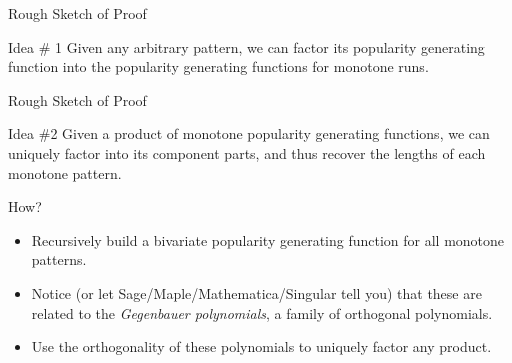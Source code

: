 \documentclass[xcolor=table,dvipsnames]{beamer}
\begin{document}
\begin{frame}{Rough Sketch of Proof}
  \pause
  \begin{block}{Idea \# 1}
    Given any arbitrary pattern, we can factor its popularity generating
    function into the popularity generating functions for monotone runs. 
  \end{block}

  \pause
  \begin{center}
  \end{center}
\end{frame}



\begin{frame}{Rough Sketch of Proof}
  \pause
  \begin{block}{Idea \#2}
    Given a product of monotone popularity generating functions, we can uniquely
    factor into its component parts, and thus recover the lengths of each
    monotone pattern.
  \end{block}
  \pause
  \begin{block}{How?}
    \begin{itemize}
      \pause
      \item Recursively build a bivariate popularity generating function for all
      monotone patterns. 
      \pause
      \item Notice (or let Sage/Maple/Mathematica/Singular tell you) that these are related to the
      \emph{Gegenbauer polynomials}, a family of orthogonal polynomials. 
      \pause
      \item Use the orthogonality of these polynomials to uniquely factor any
      product.
    \end{itemize}
  \end{block}
\end{frame}
\end{document}
